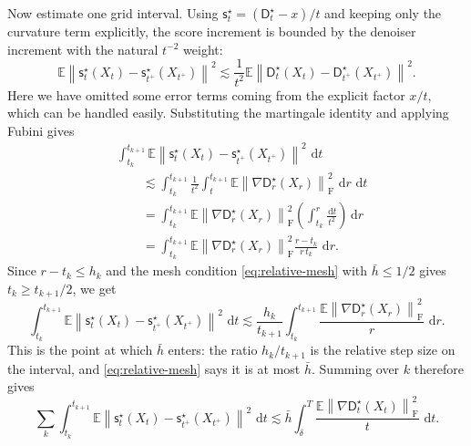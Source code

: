\documentclass{amsart}
\numberwithin{equation}{section}
\theoremstyle{plain}
\theoremstyle{definition}
\theoremstyle{remark}
\newcommand{\E}{\mathbb{E}}
\newcommand{\dd}{\,\mathrm{d}}
\newcommand{\norm}[1]{\left\lVert #1 \right\rVert}
\newcommand{\sstar}{\mathsf{s}^{\star}}
\newcommand{\dstar}{\mathsf{D}^{\star}}
\begin{document}
Now estimate one grid interval.  Using
$\sstar_t=(\dstar_t-x)/t$ and keeping only the curvature term explicitly, the
score increment is bounded by the denoiser increment with the natural $t^{-2}$
weight:
\[
    \E\norm{
        \sstar_t(X_t)-\sstar_{t^+}(X_{t^+})
    }^2
    \lesssim
    \frac{1}{t^2}
    \E\norm{
        \dstar_t(X_t)-\dstar_{t^+}(X_{t^+})
    }^2.
\]
Here we have omitted some error terms coming from the explicit factor $x/t$, which can be handled easily.  Substituting the martingale identity and applying Fubini gives
\[
\begin{aligned}
    &\int_{t_k}^{t_{k+1}}
    \E\norm{
        \sstar_t(X_t)-\sstar_{t^+}(X_{t^+})
    }^2\,\dd t  \\
    &\qquad\lesssim
    \int_{t_k}^{t_{k+1}}
    \frac{1}{t^2}
    \int_t^{t_{k+1}}
    \E\norm{\nabla \dstar_r(X_r)}_{\mathrm F}^2\,\dd r\,\dd t  \\
    &\qquad=
    \int_{t_k}^{t_{k+1}}
    \E\norm{\nabla \dstar_r(X_r)}_{\mathrm F}^2
    \left(\int_{t_k}^r\frac{\dd t}{t^2}\right)\dd r  \\
    &\qquad=
    \int_{t_k}^{t_{k+1}}
    \E\norm{\nabla \dstar_r(X_r)}_{\mathrm F}^2
    \frac{r-t_k}{r\,t_k}\,\dd r.
\end{aligned}
\]
Since $r-t_k\leq h_k$ and the mesh condition
\eqref{eq:relative-mesh} with $\bar h\leq1/2$ gives
$t_k\geq t_{k+1}/2$, we get
\[
    \int_{t_k}^{t_{k+1}}
    \E\norm{
        \sstar_t(X_t)-\sstar_{t^+}(X_{t^+})
    }^2\,\dd t
    \lesssim
    \frac{h_k}{t_{k+1}}
    \int_{t_k}^{t_{k+1}}
    \frac{\E\norm{\nabla \dstar_r(X_r)}_{\mathrm F}^2}{r}\,\dd r.
\]
This is the point at which $\bar h$ enters: the ratio $h_k/t_{k+1}$ is the
relative step size on the interval, and \eqref{eq:relative-mesh} says it is at
most $\bar h$.  Summing over $k$ therefore gives
\[
    \sum_k
    \int_{t_k}^{t_{k+1}}
    \E\norm{
        \sstar_t(X_t)-\sstar_{t^+}(X_{t^+})
    }^2\,\dd t
    \lesssim
    \bar h
    \int_\delta^T
    \frac{\E\norm{\nabla \dstar_t(X_t)}_{\mathrm F}^2}{t}\,\dd t.
\]
\end{document}
